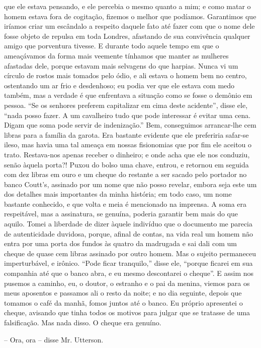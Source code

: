 que ele estava pensando, e ele percebia o mesmo quanto a mim; e como
matar o homem estava fora de cogitação, fizemos o melhor que podíamos. 
Garantimos que iríamos criar um escândalo a respeito daquele fato até
fazer com que o nome dele fosse objeto de repulsa em toda Londres,
afastando de sua convivência qualquer amigo que porventura tivesse.  E
durante todo aquele tempo em que o ameaçávamos da forma mais veemente
tínhamos que manter as mulheres afastadas dele, porque estavam mais
selvagens do que harpias.  Nunca vi um círculo de rostos mais tomados
pelo ódio, e ali estava o homem bem no centro, ostentando um ar frio e
desdenhoso; eu podia ver que ele estava com medo também, mas a verdade
é que enfrentava a situação como se fosse o demônio em pessoa.  “Se os
senhores preferem capitalizar em cima deste acidente”, disse ele, “nada
posso fazer.  A um cavalheiro tudo que pode interessar é evitar uma
cena.  Digam que soma pode servir de indenização.”  Bem, conseguimos
arrancar-lhe cem libras para a família da garota.  Era bastante
evidente que ele preferiria safar-se ileso, mas havia uma tal ameaça em
nossas fisionomias que por fim ele aceitou o trato.  Restava-nos apenas
receber o dinheiro; e onde acha que ele nos conduziu, senão àquela
porta?!  Puxou do bolso uma chave, entrou, e retornou em seguida com
dez libras em ouro e um cheque do restante a ser sacado pelo portador
no banco Coutt’s, assinado por um nome que não posso revelar, embora
seja este um dos detalhes mais importantes da minha história; em todo
caso, um nome bastante conhecido, e que volta e meia é mencionado na
imprensa.  A soma era respeitável, mas a assinatura, se genuína,
poderia garantir bem mais do que aquilo.  Tomei a liberdade de dizer
àquele indivíduo que o documento me parecia de autenticidade duvidosa,
porque, afinal de contas, na vida real um homem não entra por uma porta
dos fundos às quatro da madrugada e sai dali com um cheque de quase cem
libras assinado por outro homem.  Mas o sujeito permaneceu
imperturbável, e irônico.  “Pode ficar tranquilo,” disse ele, “porque
ficarei em sua companhia até que o banco abra, e eu mesmo descontarei o
cheque”.  E assim nos pusemos a caminho, eu, o doutor, o estranho e o
pai da menina, viemos para os meus aposentos e passamos ali o resto da
noite; e no dia seguinte, depois que tomamos o café da manhã, fomos
juntos até o banco.  Eu próprio apresentei o cheque, avisando que tinha
todos os motivos para julgar que se tratasse de uma falsificação.  Mas
nada disso.  O cheque era genuíno.

-- Ora, ora -- disse Mr. Utterson. 

